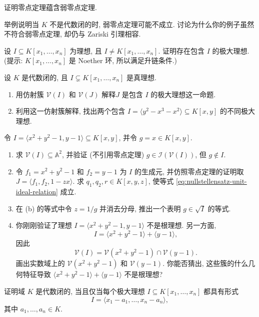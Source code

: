 \BookExerciseHeading
\begin{BookExercises}
  \item\label{ex:nullstellensatz-implies-weak-nullstellensatz} 证明零点定理蕴含弱零点定理.
  \item\label{ex:weak-nullstellensatz-fails-over-nonclosed-field} 举例说明当 $K$ 不是代数闭的时, 弱零点定理可能不成立. 讨论为什么你的例子虽然不符合弱零点定理, 却仍与 Zariski 引理相容.
  \item\label{ex:proper-ideal-contained-in-maximal-ideal} 设 $I\subseteq K[x_{1},\ldots,x_{n}]$ 为理想, 且 $I\neq K[x_{1},\ldots,x_{n}]$. 证明存在包含 $I$ 的极大理想. (提示: $K[x_{1},\ldots,x_{n}]$ 是 Noether 环, 所以满足升链条件.)
  \item\label{ex:maximal-ideal-geometric-interpretation} 设 $K$ 是代数闭的, 且 $I\subsetneq K[x_{1},\ldots,x_{n}]$ 是真理想.
  \begin{enumerate}
    \item 用仿射簇 $\mathcal{V}(I)$ 和 $\mathcal{V}(J)$ 解释\textquotedbl{}$J$ 是包含 $I$ 的极大理想\textquotedbl{}这一命题.
    \item 利用这一仿射簇解释, 找出两个包含 $I=\langle y^{2}-x^{3}-x^{2}\rangle\subseteq K[x,y]$ 的不同极大理想.
  \end{enumerate}
  \item\label{ex:nullstellensatz-tangent-varieties} 令 $I=\langle x^{2}+y^{2}-1,y-1\rangle\subseteq K[x,y]$, 并令 $g=x\in K[x,y]$.
  \begin{enumerate}
    \item 求 $\mathcal{V}(I)\subseteq\mathbb{A}^{2}$, 并验证 (不引用零点定理) $g\in\mathcal{I}(\mathcal{V}(I))$, 但 $g\notin I$.
    \item 令 $f_{1}=x^{2}+y^{2}-1$ 和 $f_{2}=y-1$ 为 $I$ 的生成元, 并仿照零点定理的证明取 $J=\langle f_{1},f_{2},1-zx\rangle$. 求 $q_{1},q_{2},r\in K[x,y,z]$, 使等式 \eqref{eq:nullstellensatz-unit-ideal-relation} 成立.
    \item 在 (b) 的等式中令 $z=1/g$ 并消去分母, 推出一个表明 $g\in\sqrt{I}$ 的等式.
    \item 你刚刚验证了理想 $I=\langle x^{2}+y^{2}-1,y-1\rangle$ 不是根理想. 另一方面,
    \[
      I=\langle x^{2}+y^{2}-1\rangle+\langle y-1\rangle,
    \]
    因此
    \[
      \mathcal{V}(I)=\mathcal{V}(x^{2}+y^{2}-1)\cap\mathcal{V}(y-1).
    \]
    画出实数域上的 $\mathcal{V}(x^{2}+y^{2}-1)$ 和 $\mathcal{V}(y-1)$. 你能否猜出, 这些簇的什么几何特征导致 $\langle x^{2}+y^{2}-1\rangle+\langle y-1\rangle$ 不是根理想?
  \end{enumerate}
  \item\label{ex:algebraic-closure-from-maximal-ideals} 证明域 $K$ 是代数闭的, 当且仅当每个极大理想 $I\subseteq K[x_{1},\ldots,x_{n}]$ 都具有形式
  \[
    I=\langle x_{1}-a_{1},\ldots,x_{n}-a_{n}\rangle,
  \]
  其中 $a_{1},\ldots,a_{n}\in K$.
\end{BookExercises}
